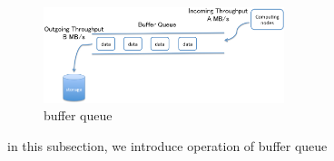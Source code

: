 \documentclass[JIP,draft]{ipsj}
\begin{document}
\begin{figure}[tb]
	\centering
	\includegraphics[width=7cm]{buffer_queue}
	\caption{buffer queue}
	\label{buffer queue}
\end{figure}

in this subsection, we introduce operation of buffer queue





\end{document}
